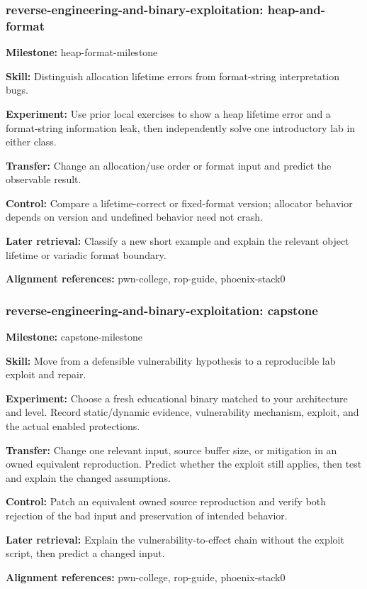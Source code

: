 \subsubsection{reverse-engineering-and-binary-exploitation: heap-and-format}
\noindent\textbf{Milestone:} heap-format-milestone\par
\noindent\textbf{Skill:} Distinguish allocation lifetime errors from format-string interpretation bugs.\par
\noindent\textbf{Experiment:} Use prior local exercises to show a heap lifetime error and a format-string information leak, then independently solve one introductory lab in either class.\par
\noindent\textbf{Transfer:} Change an allocation/use order or format input and predict the observable result.\par
\noindent\textbf{Control:} Compare a lifetime-correct or fixed-format version; allocator behavior depends on version and undefined behavior need not crash.\par
\noindent\textbf{Later retrieval:} Classify a new short example and explain the relevant object lifetime or variadic format boundary.\par
\noindent\textbf{Alignment references:} pwn-college, rop-guide, phoenix-stack0\par
\subsubsection{reverse-engineering-and-binary-exploitation: capstone}
\noindent\textbf{Milestone:} capstone-milestone\par
\noindent\textbf{Skill:} Move from a defensible vulnerability hypothesis to a reproducible lab exploit and repair.\par
\noindent\textbf{Experiment:} Choose a fresh educational binary matched to your architecture and level. Record static/dynamic evidence, vulnerability mechanism, exploit, and the actual enabled protections.\par
\noindent\textbf{Transfer:} Change one relevant input, source buffer size, or mitigation in an owned equivalent reproduction. Predict whether the exploit still applies, then test and explain the changed assumptions.\par
\noindent\textbf{Control:} Patch an equivalent owned source reproduction and verify both rejection of the bad input and preservation of intended behavior.\par
\noindent\textbf{Later retrieval:} Explain the vulnerability-to-effect chain without the exploit script, then predict a changed input.\par
\noindent\textbf{Alignment references:} pwn-college, rop-guide, phoenix-stack0\par
